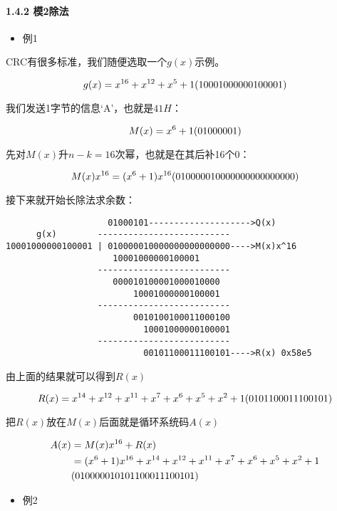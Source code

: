 \documentclass[
]{article}
\begin{document}
\hypertarget{header-n87}{%
\paragraph{1.4.2 模2除法}\label{header-n87}}

\begin{itemize}
\item
  例1
\end{itemize}

CRC有很多标准，我们随便选取一个$g(x)$示例。

$$
g(x)=x^{16}+x^{12}+x^5+1\\
(10001000000100001)
$$

我们发送1字节的信息`A'，也就是$41H$：

$$
M(x)=x^6+1\\
(01000001)
$$

先对$M(x)$升$n-k=16$次幂，也就是在其后补16个0：

$$
M(x)x^{16}=(x^6+1)x^{16}\\
(010000010000000000000000)
$$

接下来就开始长除法求余数：

\begin{verbatim}
                    01000101-------------------->Q(x)
      g(x)        --------------------------
10001000000100001 | 010000010000000000000000---->M(x)x^16
                     10001000000100001
                  --------------------------
                     000010100001000010000
                         10001000000100001
                  --------------------------
                         0010100100011000100
                           10001000000100001
                  --------------------------
                           00101100011100101---->R(x) 0x58e5
\end{verbatim}

由上面的结果就可以得到$R(x)$

$$
R(x)=x^{14}+x^{12}+x^{11}+x^{7}+x^{6}+x^{5}+x^{2}+1\\
(0101100011100101)
$$

把$R(x)$放在$M(x)$后面就是循环系统码$A(x)$

$$
\begin{align}
A(x)&=M(x)x^{16}+R(x)\\
&=(x^6+1)x^{16}+x^{14}+x^{12}+x^{11}+x^{7}+x^{6}+x^{5}+x^{2}+1\\
&(01000001 \space 0101100011100101)
\end{align}
$$

\begin{itemize}
\item
  例2
\end{itemize}
\end{document}
